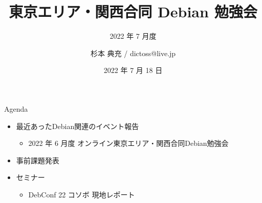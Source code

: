\title{東京エリア・関西合同 Debian 勉強会}
\subtitle{2022 年 7 月度} %
\author{杉本 典充 / dictoss@live.jp}
\date{2022 年 7 月 18 日}



\begin{frame}
\titlepage{}
\end{frame}

\begin{frame}{Agenda}
 \begin{minipage}[t]{0.45\hsize}
  \begin{itemize}
  \item 最近あったDebian関連のイベント報告
    \begin{itemize}
    \item 2022 年 6 月度 オンライン東京エリア・関西合同Debian勉強会
    \end{itemize}
  \item 事前課題発表
  \end{itemize}
 \end{minipage}
 \begin{minipage}[t]{0.45\hsize}
   \begin{itemize}
   \item セミナー
     \begin{itemize}
     \item DebConf 22 コソボ 現地レポート
     \end{itemize}
  \end{itemize}
 \end{minipage}
\end{frame}

